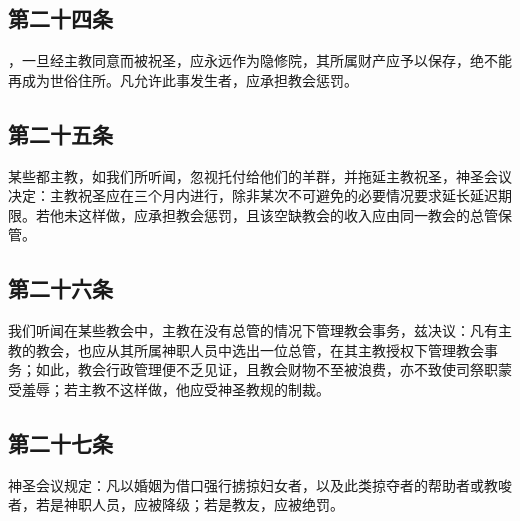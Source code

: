 
\subsection{第二十四条}

，一旦经主教同意而被祝圣，应永远作为隐修院，其所属财产应予以保存，绝不能再成为世俗住所。凡允许此事发生者，应承担教会惩罚。\par


\subsection{第二十五条}

某些都主教，如我们所听闻，忽视托付给他们的羊群，并拖延主教祝圣，神圣会议决定：主教祝圣应在三个月内进行，除非某次不可避免的必要情况要求延长延迟期限。若他未这样做，应承担教会惩罚，且该空缺教会的收入应由同一教会的总管保管。\par


\subsection{第二十六条}

我们听闻在某些教会中，主教在没有总管的情况下管理教会事务，兹决议：凡有主教的教会，也应从其所属神职人员中选出一位总管，在其主教授权下管理教会事务；如此，教会行政管理便不乏见证，且教会财物不至被浪费，亦不致使司祭职蒙受羞辱；若主教不这样做，他应受神圣教规的制裁。\par


\subsection{第二十七条}

神圣会议规定：凡以婚姻为借口强行掳掠妇女者，以及此类掠夺者的帮助者或教唆者，若是神职人员，应被降级；若是教友，应被绝罚。\par


